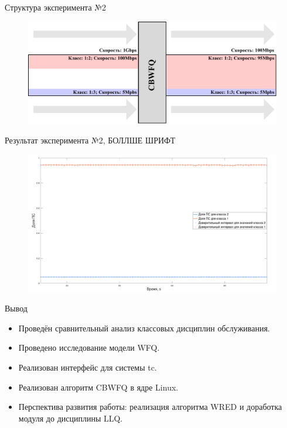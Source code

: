 \documentclass[12pt]{beamer}
\begin{document}
\begin{frame}{Структура эксперимента №2}
	\begin{figure}
		\center
    	\includegraphics[scale=0.6]{../text/pdfimages/exp_scheme2.pdf}
	\end{figure}
\end{frame}

\begin{frame}{Результат эксперимента №2, БОЛЛШЕ ШРИФТ}
	\begin{figure}
		\center
    	\includegraphics[scale=0.28]{../text/plotnc.png}
	\end{figure}
\end{frame}



\begin{frame}{Вывод}
	\begin{itemize}
		\item Проведён сравнительный анализ классовых дисциплин обслуживания.
		\item Проведено исследование модели WFQ.
		\item Реализован интерфейс для системы tc.
		\item Реализован алгоритм CBWFQ в ядре Linux.
		\item Перспектива развития работы: реализация алгоритма WRED и доработка модуля до дисциплины LLQ.
	\end{itemize}
\end{frame}

\itmothankyou
\end{document}
